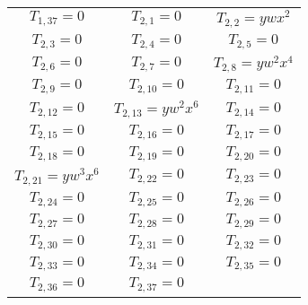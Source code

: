 \begin{longtable}{|c|c|c|}
$T_{1,37}= 0$&

$T_{2,1}= 0$&

$T_{2,2}= ywx^2$\\

$T_{2,3}= 0$&

$T_{2,4}= 0$&

$T_{2,5}= 0$\\

$T_{2,6}= 0$&

$T_{2,7}= 0$&

$T_{2,8}= yw^2x^4$\\

$T_{2,9}= 0$&

$T_{2,10}= 0$&

$T_{2,11}= 0$\\

$T_{2,12}= 0$&

$T_{2,13}= yw^2x^6$&

$T_{2,14}= 0$\\

$T_{2,15}= 0$&

$T_{2,16}= 0$&

$T_{2,17}= 0$\\

$T_{2,18}= 0$&

$T_{2,19}= 0$&

$T_{2,20}= 0$\\

$T_{2,21}= yw^3x^6$&

$T_{2,22}= 0$&

$T_{2,23}= 0$\\

$T_{2,24}= 0$&

$T_{2,25}= 0$&

$T_{2,26}= 0$\\

$T_{2,27}= 0$&

$T_{2,28}= 0$&

$T_{2,29}= 0$\\

$T_{2,30}= 0$&

$T_{2,31}= 0$&

$T_{2,32}= 0$\\

$T_{2,33}= 0$&

$T_{2,34}= 0$&

$T_{2,35}= 0$\\

$T_{2,36}= 0$&

$T_{2,37}= 0$&


\end{longtable}
